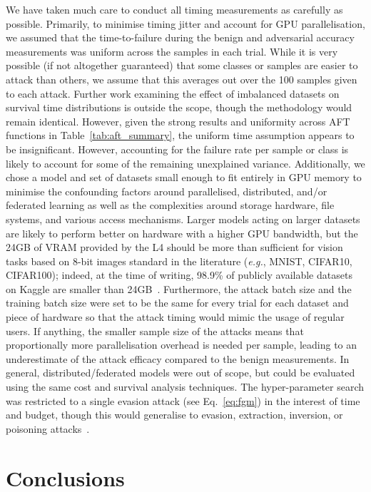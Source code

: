 \documentclass[conference]{IEEEtran}%
\begin{document}
We have taken much care to conduct all timing measurements as carefully as possible.
Primarily, to minimise timing jitter and account for GPU parallelisation, we assumed that the time-to-failure during the benign and adversarial accuracy measurements was uniform across the samples in each trial.
While it is very possible (if not altogether guaranteed) that some classes or samples are easier to attack than others, we assume that this averages out over the 100 samples given to each attack. 
Further work examining the effect of imbalanced datasets on survival time distributions is outside the scope, though the methodology would remain identical.
However, given the strong results and uniformity across AFT functions in Table~\ref{tab:aft_summary}, the uniform time assumption appears to be insignificant. However, accounting for the failure rate per sample or class is likely to account for some of the remaining unexplained variance.
Additionally, we chose a model and set of datasets small enough to fit entirely in GPU memory to minimise the confounding factors around parallelised, distributed, and/or federated learning as well as the complexities around storage hardware, file systems, and various access mechanisms.
Larger models acting on larger datasets are likely to perform better on hardware with a higher GPU bandwidth, but the 24GB of VRAM provided by the L4 should be more than sufficient for vision tasks based on 8-bit images standard in the literature (\textit{e.g.}, MNIST, CIFAR10, CIFAR100); indeed, at the time of writing, 98.9\% of publicly available datasets on Kaggle are smaller than 24GB~\cite{kagglehub}. 
Furthermore, the attack batch size and the training batch size were set to be the same for every trial for each dataset and piece of hardware so that the attack timing would mimic the usage of regular users.
If anything, the smaller sample size of the attacks means that proportionally more parallelisation overhead is needed per sample, leading to an underestimate of the attack efficacy compared to the benign measurements.
In general, distributed/federated models were out of scope, but could be evaluated using the same cost and survival analysis techniques.
The hyper-parameter search was restricted to a single evasion attack (see Eq.~\ref{eq:fgm}) in the interest of time and budget, though this would generalise to evasion, extraction, inversion, or poisoning attacks~\cite{biggio_evasion_2013,biggio_poisoning_2013,choquette2021label,orekondy2019knockoff}.



\section{Conclusions}
\label{conclusion}
\end{document}
